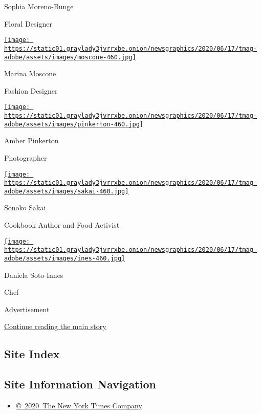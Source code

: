 Sophia Moreno-Bunge

Floral Designer

\href{https://www.nytimes3xbfgragh.onion/2020/08/10/t-magazine/marina-moscone-fashion-design.html}{\texttt{[image: https://static01.graylady3jvrrxbe.onion/newsgraphics/2020/06/17/tmag-adobe/assets/images/moscone-460.jpg]}}

Marina Moscone

Fashion Designer

\href{https://www.nytimes3xbfgragh.onion/2020/08/10/t-magazine/amber-pinkerton-photography.html}{\texttt{[image: https://static01.graylady3jvrrxbe.onion/newsgraphics/2020/06/17/tmag-adobe/assets/images/pinkerton-460.jpg]}}

Amber Pinkerton

Photographer

\href{https://www.nytimes3xbfgragh.onion/2020/08/10/t-magazine/sonoko-sakai-chef-cooking-soba.html}{\texttt{[image: https://static01.graylady3jvrrxbe.onion/newsgraphics/2020/06/17/tmag-adobe/assets/images/sakai-460.jpg]}}

Sonoko Sakai

Cookbook Author and Food Activist

\href{https://www.nytimes3xbfgragh.onion/2020/08/10/t-magazine/daniela-soto-innes-cooking-chef.html}{\texttt{[image: https://static01.graylady3jvrrxbe.onion/newsgraphics/2020/06/17/tmag-adobe/assets/images/ines-460.jpg]}}

Daniela Soto-Innes

Chef

Advertisement

\protect\hyperlink{after-bottom}{Continue reading the main story}

\hypertarget{site-index}{%
\subsection{Site Index}\label{site-index}}

\hypertarget{site-information-navigation}{%
\subsection{Site Information
Navigation}\label{site-information-navigation}}

\begin{itemize}
\tightlist
\item
  \href{https://help.nytimes3xbfgragh.onion/hc/en-us/articles/115014792127-Copyright-notice}{©~2020~The
  New York Times Company}
\end{itemize}


